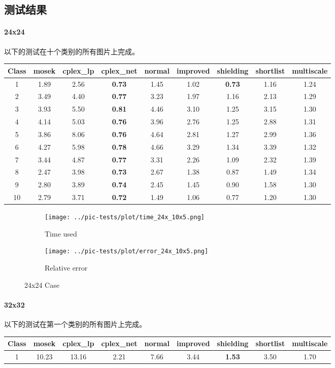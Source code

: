 \documentclass[]{article}
\let\oldparagraph\paragraph
\renewcommand{\paragraph}[1]{\oldparagraph{#1}\mbox{}}
\begin{document}
\subsection{测试结果}
\paragraph{24x24}

以下的测试在十个类别的所有图片上完成。

\begin{longtable}[]{@{}c|cccccccc@{}}
\hline
Class & mosek & cplex\_lp & cplex\_net & normal & improved & shielding &
shortlist & multiscale\tabularnewline
\hline
1 & 1.89 & 2.56 & \textbf{0.73} & 1.45 & 1.02 & \textbf{0.73} & 1.16 &
1.24\tabularnewline
2 & 3.49 & 4.40 & \textbf{0.77} & 3.23 & 1.97 & 1.16 & 2.13 &
1.29\tabularnewline
3 & 3.93 & 5.50 & \textbf{0.81} & 4.46 & 3.10 & 1.25 & 3.15 &
1.30\tabularnewline
4 & 4.14 & 5.03 & \textbf{0.76} & 3.96 & 2.76 & 1.25 & 2.88 &
1.31\tabularnewline
5 & 3.86 & 8.06 & \textbf{0.76} & 4.64 & 2.81 & 1.27 & 2.99 &
1.36\tabularnewline
6 & 4.27 & 5.98 & \textbf{0.78} & 4.66 & 3.29 & 1.34 & 3.39 &
1.32\tabularnewline
7 & 3.44 & 4.87 & \textbf{0.77} & 3.31 & 2.26 & 1.09 & 2.32 &
1.39\tabularnewline
8 & 2.47 & 3.98 & \textbf{0.73} & 2.67 & 1.38 & 0.87 & 1.49 &
1.34\tabularnewline
9 & 2.80 & 3.89 & \textbf{0.74} & 2.45 & 1.45 & 0.90 & 1.58 &
1.30\tabularnewline
10 & 2.79 & 3.71 & \textbf{0.72} & 1.49 & 1.06 & 0.77 & 1.20 &
1.30\tabularnewline
\hline
\end{longtable}

\begin{figure}[htpb]
	\centering
	\begin{subfigure}{0.49 \textwidth}
		\centering
		\texttt{[image: ../pic-tests/plot/time\_24x\_10x5.png]}
		\caption{Time used}
	\end{subfigure}
	\begin{subfigure}{0.49 \textwidth}
		\centering
		\texttt{[image: ../pic-tests/plot/error\_24x\_10x5.png]}
		\caption{Relative error}
	\end{subfigure}
	\caption{24x24 Case}
\end{figure}

\paragraph{32x32}

以下的测试在第一个类别的所有图片上完成。

\begin{longtable}[]{@{}c|cccccccc@{}}
\hline
Class & mosek & cplex\_lp & cplex\_net & normal & improved & shielding &
shortlist & multiscale\tabularnewline
\hline
1 & 10.23 & 13.16 & 2.21 & 7.66 & 3.44 & \textbf{1.53} & 3.50 &
1.70\tabularnewline
\hline
\end{longtable}
\end{document}
